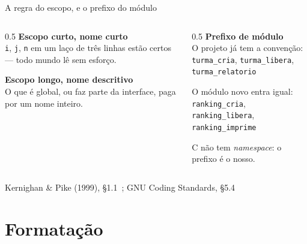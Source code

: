 \documentclass[aspectratio=169]{beamer}
\newcommand{\fonte}[1]{\vfill\hfill{\scriptsize\textcolor{UFSGray}{#1}}}
\begin{document}
\begin{frame}{A regra do escopo, e o prefixo do módulo}
  \begin{columns}[T]
    \begin{column}{0.5\textwidth}
      \textbf{Escopo curto, nome curto}\\[0.3em]
      \texttt{i}, \texttt{j}, \texttt{n} em um laço de três linhas estão
      certos --- todo mundo lê sem esforço.

      \medskip
      \textbf{Escopo longo, nome descritivo}\\[0.3em]
      O que é global, ou faz parte da interface, paga por um nome inteiro.
    \end{column}
    \begin{column}{0.5\textwidth}
      \textbf{Prefixo de módulo}\\[0.3em]
      O projeto já tem a convenção:\\[0.3em]
      \texttt{turma\_cria}, \texttt{turma\_libera},
      \texttt{turma\_relatorio}

      \medskip
      O módulo novo entra igual:\\[0.3em]
      \texttt{ranking\_cria}, \texttt{ranking\_libera},
      \texttt{ranking\_imprime}

      \medskip
      C não tem \emph{namespace}: o prefixo é o nosso.
    \end{column}
  \end{columns}
  \fonte{Kernighan \& Pike (1999), §1.1~\cite{kernighan1999practice}; GNU Coding Standards, §5.4~\cite{gnu2024standards}}
\end{frame}

\section{Formatação}
\end{document}
